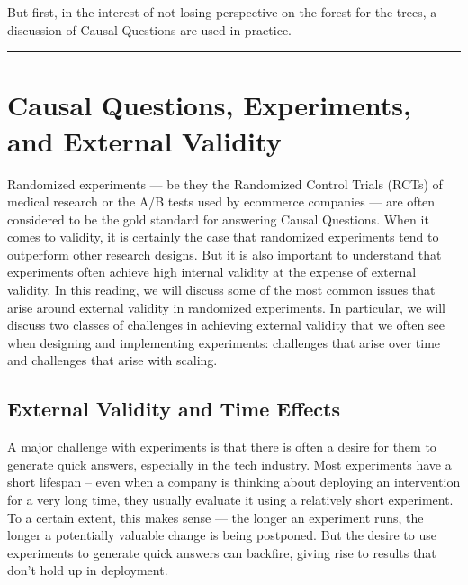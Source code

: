 \documentclass[letterpaper,10pt,english]{jupyterBook}
\begin{document}
\sphinxAtStartPar
But first, in the interest of not losing perspective on the forest for the trees, a discussion of  Causal Questions are used in practice.


\bigskip\hrule\bigskip


\sphinxstepscope


\chapter{Causal Questions, Experiments, and External Validity}
\label{\detokenize{30_questions/45_causal_questions_external:causal-questions-experiments-and-external-validity}}\label{\detokenize{30_questions/45_causal_questions_external::doc}}
\sphinxAtStartPar
Randomized experiments — be they the Randomized Control Trials (RCTs) of medical research or the A/B tests used by e\sphinxhyphen{}commerce companies — are often considered to be the gold standard for answering Causal Questions. When it comes to  validity, it is certainly the case that randomized experiments tend to outperform other research designs. But it is also important to understand that experiments often achieve high internal validity at the expense of external validity. In this reading, we will discuss some of the most common issues that arise around external validity in randomized experiments. In particular, we will discuss two classes of challenges in achieving external validity that we often see when designing and implementing experiments: challenges that arise over time and challenges that arise with scaling.


\section{External Validity and Time Effects}
\label{\detokenize{30_questions/45_causal_questions_external:external-validity-and-time-effects}}
\sphinxAtStartPar
A major challenge with experiments is that there is often a desire for them to generate quick answers, especially in the tech industry. Most experiments have a short lifespan – even when a company is thinking about deploying an intervention for a very long time, they usually evaluate it using a relatively short experiment. To a certain extent, this makes sense — the longer an experiment runs, the longer a potentially valuable change is being postponed. But the desire to use experiments to generate quick answers can backfire, giving rise to results that don’t hold up in deployment.
\end{document}
